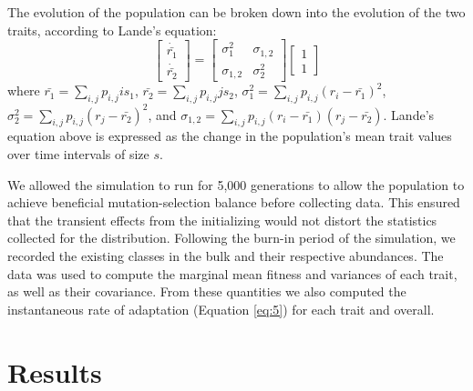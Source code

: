 \documentclass[9pt,twocolumn,twoside]{gsajnl}
\begin{document}
The evolution of the population can be broken down into the evolution of the two traits, according to Lande's equation:
\begin{equation}\label{eq:5}
\left[
\begin{array}{c}
\dot{\bar{r_1}} \\
\dot{\bar{r_2}} 
\end{array}
\right]
=
\left[
\begin{array}{cc}
\sigma_1^2 & \sigma_{1,2} \\
\sigma_{1,2} & \sigma_2^2 
\end{array}
\right]
\left[
\begin{array}{c}
1 \\
1 
\end{array}
\right]
\end{equation}where  $\bar{r_1}=\sum_{i,j} p_{i,j} is_1$, $\bar{r_2}=\sum_{i,j} p_{i,j} j s_2$, $\sigma_1^2 = \sum_{i,j} p_{i,j} (r_i-\bar{r_1})^2$, $\sigma_2^2 = \sum_{i,j} p_{i,j} (r_j-\bar{r_2})^2$, and  $\sigma_{1,2} =\sum_{i,j} p_{i,j} (r_i-\bar{r_1})(r_j-\bar{r_2})$. Lande's equation above is expressed as the change in the population's mean trait values over time intervals of size $s$. \par
% 
% 
% 
% 


We allowed the simulation to run for 5,000 generations to allow the population to achieve beneficial mutation-selection balance before collecting data. This ensured that the transient effects from the initializing would not distort the statistics collected for the distribution. Following the burn-in period of the simulation, we recorded the existing classes in the bulk and their respective abundances. The data was used to compute the marginal mean fitness and variances of each trait, as well as their covariance. From these quantities we also computed the instantaneous rate of adaptation (Equation \ref{eq:5}) for each trait and overall.\par
% 
% 

\section*{Results}
\label{sec:results}
\end{document}
